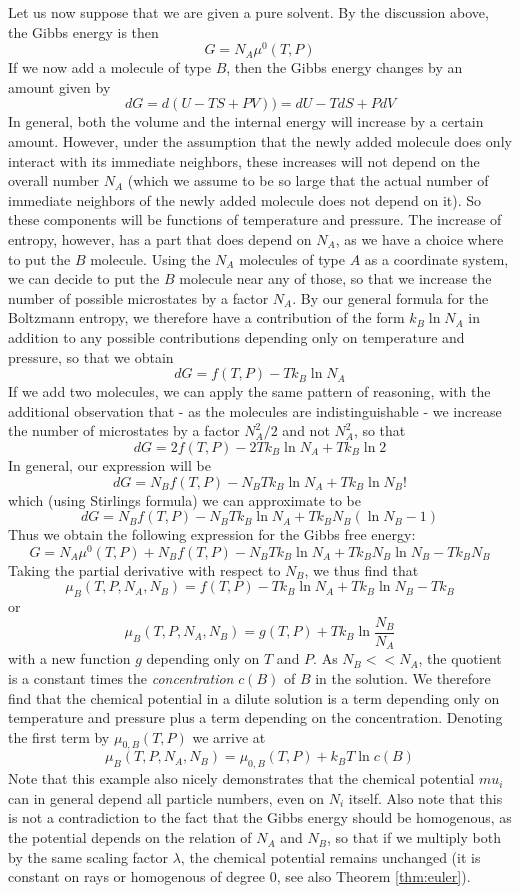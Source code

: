 \documentclass[a4paper, draft]{report}
\numberwithin{section}{chapter}
\numberwithin{equation}{chapter}
\theoremstyle{own}
\theoremstyle{remark}
\begin{document}
Let us now suppose that we are given a pure solvent. By the discussion above, the Gibbs energy is then
$$
G = N_A \mu^0 (T, P)
$$
If we now add a molecule of type $B$, then the Gibbs energy changes by an amount given by 
$$
dG = d(U - TS + PV) ) = dU - T dS + P dV
$$
In general, both the volume and the internal energy will increase by a certain amount. However, under the assumption that the newly added molecule does only interact with its immediate neighbors, these increases will not depend on the overall number $N_A$ (which we assume to be so large that the actual number of immediate neighbors of the newly added molecule does not depend on it). So these components will be functions of temperature and pressure. The increase of entropy, however, has a part that does depend on $N_A$, as we have a choice where to put the $B$ molecule. Using the $N_A$ molecules of type $A$ as a coordinate system, we can decide to put the $B$ molecule near any of those, so that we increase the number of possible microstates by a factor $N_A$. By our general formula for the Boltzmann entropy, we therefore have a contribution of the form $k_B \ln N_A$ in addition to any possible contributions depending only on temperature and pressure, so that we obtain
$$
dG = f(T, P) - T k_B \ln N_A
$$
If we add two molecules, we can apply the same pattern of reasoning, with the additional observation that - as the molecules are indistinguishable - we increase the number of microstates by a factor $N_A^2 / 2$ and not $N_A^2$, so that
$$
dG = 2 f(T, P) - 2 T k_B \ln N_A + T k_B \ln 2
$$
In general, our expression will be
$$
dG = N_B f(T, P) - N_B T k_B \ln N_A + T k_B \ln N_B!
$$
which (using Stirlings formula) we can approximate to be
$$
dG = N_B f(T, P) - N_B T k_B \ln N_A + T k_B N_B (\ln N_B - 1)
$$
Thus we obtain the following expression for the Gibbs free energy:
$$
G = N_A \mu^0 (T, P) + N_B f(T, P) - N_B T k_B \ln N_A + T k_B N_B \ln N_B - T k_B N_B
$$
Taking the partial derivative with respect to $N_B$, we thus find that
$$
\mu_B(T, P, N_A, N_B) = f(T, P) - T k_B \ln N_A + T k_B \ln N_B - T k_B 
$$
or
$$
\mu_B(T, P, N_A, N_B) = g(T, P) + T k_B \ln \frac{N_B}{N_A}  
$$
with a new function $g$ depending only on $T$ and $P$. As $N_B << N_A$, the quotient is a constant times the {\em concentration} $c(B)$ of $B$ in the solution. We therefore find that the chemical potential in a dilute solution is a term depending only on temperature and pressure plus a term depending on the concentration. Denoting the first term by $\mu_{0, B}(T, P)$ we arrive at
$$
\mu_B(T, P, N_A, N_B) = \mu_{0, B}(T, P) + k_B T \ln c(B)
$$
Note that this example also nicely demonstrates that the chemical potential $mu_i$ can in general depend all particle numbers, even on $N_i$ itself. Also note that this is not a contradiction to the fact that the Gibbs energy should be homogenous, as the potential depends on the relation of $N_A$ and $N_B$, so that if we multiply both by the same scaling factor $\lambda$, the chemical potential remains unchanged (it is constant on rays or homogenous of degree 0, see also Theorem \ref{thm:euler}).
\end{document}
